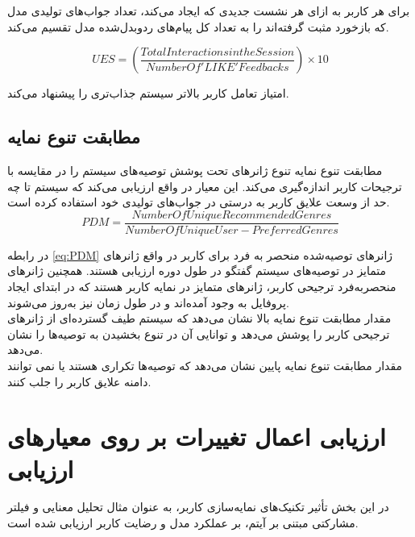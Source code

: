 برای هر کاربر به ازای هر نشست جدیدی که ایجاد می‌کند، تعداد جواب‌های تولیدی مدل که بازخورد مثبت گرفته‌اند را به تعداد کل پیام‌های ردو‌بدل‌شده مدل تقسیم می‌کند.

\begin{flushright}
\begin{equation}
UES = \left( \frac{Total Interactions in the Session}{Number Of 'LIKE' Feedbacks} \right) \times 10
\end{equation}
\end{flushright}

امتیاز تعامل کاربر بالاتر سیستم جذاب‌تری را پیشنهاد می‌کند.

\subsection[مطابقت تنوع نمایه]{مطابقت تنوع نمایه}

مطابقت تنوع نمایه تنوع ژانرهای تحت پوشش توصیه‌های سیستم را در مقایسه با ترجیحات کاربر اندازه‌گیری می‌کند. این معیار در واقع ارزیابی می‌کند که سیستم تا چه حد از وسعت علایق کاربر به درستی در جواب‌های تولیدی خود استفاده کرده است.
\begin{equation}
PDM = \frac{Number Of Unique Recommended Genres}{Number Of Unique User-Preferred Genres}
\label{eq:PDM}
\end{equation}
   

 در رابطه 
\ref{eq:PDM}
ژانرهای توصیه‌شده منحصر به فرد برای کاربر در واقع  ژانرهای متمایز در توصیه‌های سیستم گفتگو در طول دوره ارزیابی هستند. همچنین ژانرهای منحصربه‌فرد ترجیحی کاربر، ژانرهای متمایز در نمایه کاربر هستند که در ابتدای ایجاد پروفایل به وجود آمده‌اند و در طول زمان نیز به‌روز می‌شوند.\\


مقدار مطابقت تنوع نمایه بالا نشان می‌دهد که سیستم طیف گسترده‌ای از ژانرهای ترجیحی کاربر را پوشش می‌دهد و توانایی آن در تنوع بخشیدن به توصیه‌ها را نشان می‌دهد.
\\
مقدار مطابقت تنوع نمایه پایین نشان می‌دهد که توصیه‌ها تکراری هستند یا نمی توانند دامنه علایق کاربر را جلب کنند.

\section{ارزیابی اعمال تغییرات بر روی معیارهای ارزیابی}

در این بخش تأثیر تکنیک‌های نمایه‌سازی کاربر، به عنوان مثال تحلیل معنایی و فیلتر مشارکتی مبتنی بر آیتم، بر عملکرد مدل و رضایت کاربر ارزیابی شده است.

